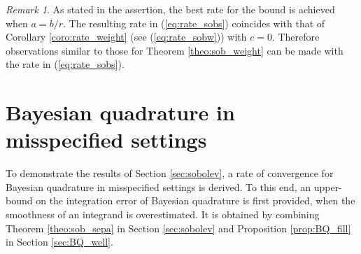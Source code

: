 \documentclass[11pt]{article}
\theoremstyle{remark}
\newtheorem{remark}{Remark}
\theoremstyle{example}
\theoremstyle{remark}
\begin{document}
\begin{remark} 
As stated in the assertion, the best rate for the bound is achieved when $a = b/r$.
The resulting rate in (\ref{eq:rate_sobs}) coincides with that of Corollary \ref{coro:rate_weight} (see (\ref{eq:rate_sobw})) with $c = 0$.
Therefore observations similar to those for Theorem \ref{theo:sob_weight} can be made with the rate in (\ref{eq:rate_sobs}).
\end{remark}












\section{Bayesian quadrature in misspecified settings}\label{sec:BQ_quasi}

To demonstrate the results of Section \ref{sec:sobolev}, a rate of convergence for Bayesian quadrature in misspecified settings is derived.
To this end, an upper-bound on the integration error of Bayesian quadrature is first provided, when the smoothness of an integrand is overestimated.
It is obtained by combining Theorem \ref{theo:sob_sepa} in Section \ref{sec:sobolev} and Proposition \ref{prop:BQ_fill} in Section \ref{sec:BQ_well}.
\end{document}
